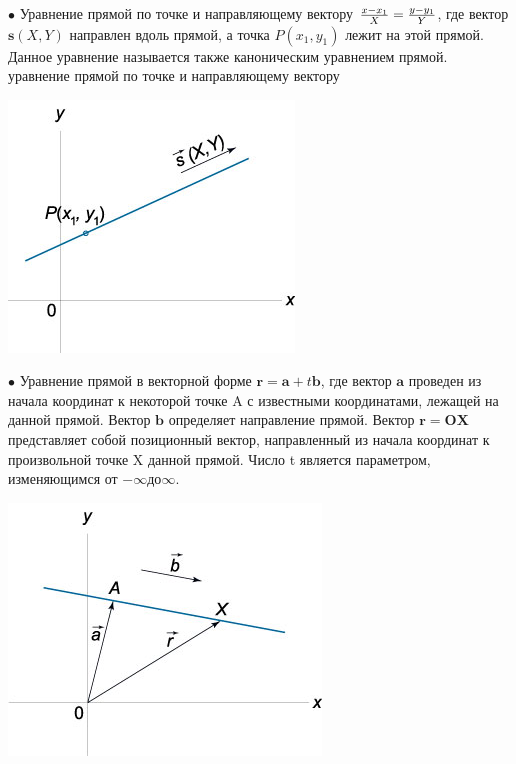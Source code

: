 \documentclass[oneside]{book}
\begin{document}
\begin{enumerate}
\begin{itemize}
\begin{enumerate}
$\bullet$ Уравнение прямой по точке и направляющему вектору  
$\large\frac{{x - {x_1}}}{X}\normalsize = \large\frac{{y - {y_1}}}{Y}\normalsize$,
где вектор $\mathbf{s}\left( {X,Y} \right)$ направлен вдоль прямой, а точка $P\left( {{x_1},{y_1}} \right)$ лежит на этой прямой. Данное уравнение называется также каноническим уравнением прямой.
уравнение прямой по точке и направляющему вектору

\begin{center}
\includegraphics[scale=0.4]{./pics/9.jpg}
\end{center}

$\bullet$ Уравнение прямой в векторной форме
$\mathbf{r}= \mathbf{a} + t\mathbf{b}$,
где вектор $\mathbf{a}$ проведен из начала координат к некоторой точке A с известными координатами, лежащей на данной прямой. Вектор $\mathbf{b}$ определяет направление прямой. Вектор $\mathbf{r} = \mathbf{OX}$ представляет собой позиционный вектор, направленный из начала координат к произвольной точке X данной прямой. Число t является параметром, изменяющимся от $- \infty $до$ \infty$.

\begin{center}
\includegraphics[scale=0.4]{./pics/12.jpg}
\end{center}


\end{enumerate}
\end{itemize}
\end{enumerate}
\end{document}
